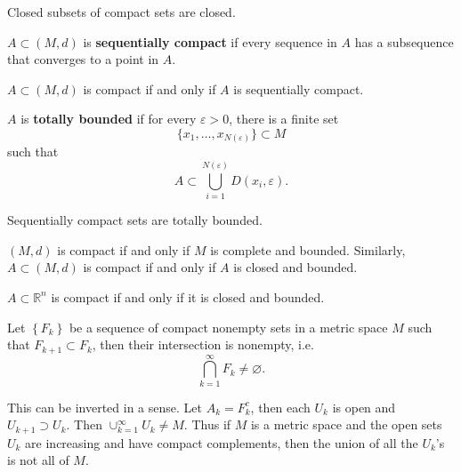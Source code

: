 \documentclass[twoside,10pt]{report}
\begin{document}
\begin{prop}
Closed subsets of compact sets are closed.
\end{prop}

\begin{defn}[]
	$A \subset (M,d)$ is \textbf{sequentially compact} if every sequence in $A$ has a subsequence that converges to a point in $A$.
\end{defn}

\begin{thrm}
	$A \subset (M,d)$ is compact if and only if $A$ is sequentially compact.
\end{thrm}

\begin{defn}[]
	$A$ is \textbf{totally bounded} if for every $\varepsilon>0$, there is a finite set \[\{ x_1,\dots,x_{N(\varepsilon)} \} \subset M\] such that \[A \subset \bigcup_{i=1}^{N(\varepsilon)} D(x_i,\varepsilon).\]
\end{defn}

\begin{prop}
Sequentially compact sets are totally bounded.
\end{prop}

\begin{thrm}[]
	$(M,d)$ is compact if and only if $M$ is complete and bounded. Similarly, $A \subset (M,d)$ is compact if and only if $A$ is closed and bounded.
\end{thrm}

\begin{thrm}
	$A \subset \mathbb{R}^n$ is compact if and only if it is closed and bounded.
\end{thrm}

\begin{thrm}
	Let $\left\{ F_k \right\}$ be a sequence of compact nonempty sets in a metric space $M$ such that $F_{k+1}\subset F_k$, then their intersection is nonempty, i.e.
	 \[
	\bigcap_{k=1}^\infty F_k \neq \varnothing.
	\] 
\end{thrm}

This can be inverted in a sense. Let $A_k = F_k^c$, then each $U_k$ is open and $U_{k+1} \supset U_k$. Then $\cup_{k=1}^\infty U_k \neq M$. Thus if $M$ is a metric space and the open sets $U_k$ are increasing and have compact complements, then the union of all the $U_k$'s is not all of $M$. 
\end{document}
